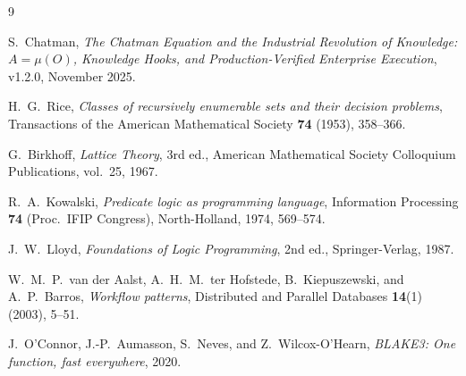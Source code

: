 \documentclass[11pt,oneside]{book}
\theoremstyle{definition}
\theoremstyle{plain}
\theoremstyle{remark}
\begin{document}
\begin{thebibliography}{9}

S.~Chatman,
\emph{The Chatman Equation and the Industrial Revolution of Knowledge:
$A=\mu(O)$, Knowledge Hooks, and Production-Verified Enterprise Execution},
v1.2.0, November 2025.

H.~G.~Rice,
\emph{Classes of recursively enumerable sets and their decision problems},
Transactions of the American Mathematical Society \textbf{74} (1953), 358--366.

G.~Birkhoff,
\emph{Lattice Theory},
3rd ed., American Mathematical Society Colloquium Publications, vol.~25, 1967.

R.~A.~Kowalski,
\emph{Predicate logic as programming language},
Information Processing \textbf{74} (Proc.\ IFIP Congress), North-Holland, 1974, 569--574.

J.~W.~Lloyd,
\emph{Foundations of Logic Programming},
2nd ed., Springer-Verlag, 1987.

W.~M.~P.~van der Aalst, A.~H.~M.~ter Hofstede, B.~Kiepuszewski, and A.~P.~Barros,
\emph{Workflow patterns},
Distributed and Parallel Databases \textbf{14}(1) (2003), 5--51.

J.~O'Connor, J.-P.~Aumasson, S.~Neves, and Z.~Wilcox-O'Hearn,
\emph{BLAKE3: One function, fast everywhere},
2020.

\end{thebibliography}
\end{document}
